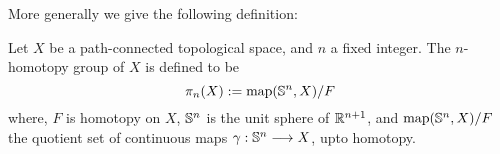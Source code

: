 More generally we give the following definition:

\begin{defn}\cite{mamouni2022pure}
   Let $X$ be a path-connected topological space, and $n$ a fixed integer. The $n$-homotopy group of $X$ is defined to be 
   \[  
      \pi_n(X) := \operatorname{map}(\mathbb{S}^n, X) / F
   \]
   where, $F$ is homotopy on $X$, $\mathbb{S}^n$ is the unit sphere of $\mathbb{R}^{n+1}$, and $\operatorname{map}(\mathbb{S}^n, X) / F$ the quotient set of continuous maps $\gamma: \mathbb{S}^n \longrightarrow X$, upto homotopy.
\end{defn}

